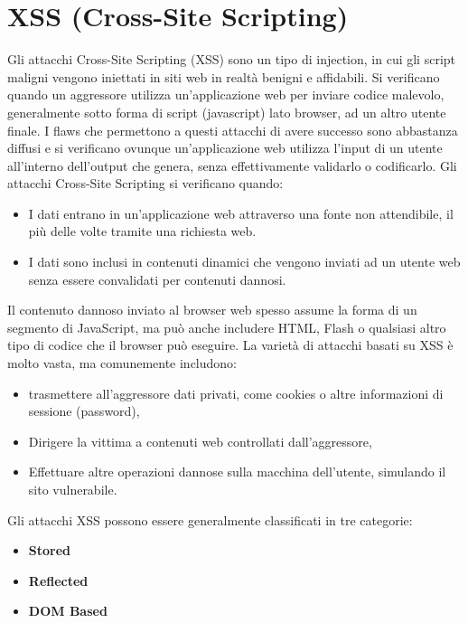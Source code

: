 \chapter{XSS (Cross-Site Scripting)}

Gli attacchi Cross-Site Scripting (XSS) sono un tipo di injection, in cui gli
script maligni
vengono iniettati in siti web in realtà benigni e affidabili.
Si verificano quando un aggressore
utilizza un'applicazione web per inviare codice malevolo, generalmente sotto
forma di script
(javascript) lato browser, ad un altro utente finale.
I flaws che permettono a questi attacchi di avere successo sono abbastanza diffusi
e si
verificano ovunque un'applicazione web utilizza l'input di un utente all'interno
dell'output che
genera, senza effettivamente validarlo o codificarlo.
Gli attacchi Cross-Site Scripting si verificano quando:

\begin{itemize}
      \item I dati entrano in un'applicazione web attraverso una fonte non
            attendibile, il più delle
            volte tramite una richiesta web.
      \item I dati sono inclusi in contenuti dinamici che vengono inviati ad un
            utente web senza
            essere convalidati per contenuti dannosi.
\end{itemize}

Il contenuto dannoso inviato al browser web spesso assume la forma di un segmento
di JavaScript, ma può anche includere HTML, Flash o qualsiasi altro tipo di codice
che il browser può eseguire.
La varietà di attacchi basati su XSS è molto vasta, ma comunemente includono:

\begin{itemize}
      \item trasmettere all'aggressore dati privati, come cookies o altre
            informazioni di sessione (password),
      \item Dirigere la vittima a contenuti web controllati dall'aggressore,
      \item Effettuare altre operazioni dannose sulla macchina dell'utente,
            simulando il sito vulnerabile.
\end{itemize}

Gli attacchi XSS possono essere generalmente classificati in tre categorie:

\begin{itemize}
      \item \textbf{Stored}
      \item \textbf{Reflected}
      \item \textbf{DOM Based}
\end{itemize}

